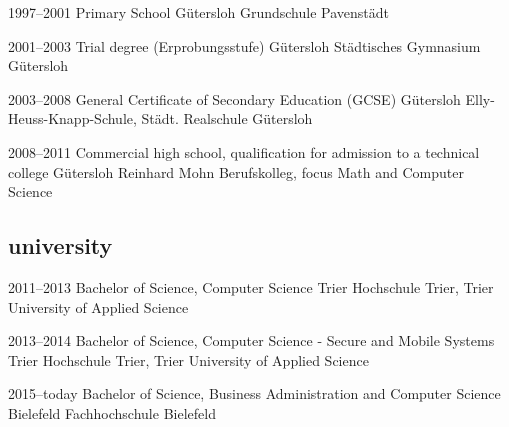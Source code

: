\documentclass[]{friggeri-cv} %
\begin{document}
\begin{entrylist}


\entry
{1997--2001}
{Primary School}
{G\"{u}tersloh}
{Grundschule Pavenst\"{a}dt}


\entry
{2001--2003}
{Trial degree (Erprobungsstufe)}
{G\"{u}tersloh}
{St\"{a}dtisches Gymnasium G\"{u}tersloh}


\entry
{2003--2008}
{General Certificate of Secondary Education (GCSE)}
{G\"{u}tersloh}
{Elly-Heuss-Knapp-Schule, St\"{a}dt. Realschule G\"{u}tersloh}


\entry
{2008--2011}
{Commercial high school, qualification for admission to a technical college}
{G\"{u}tersloh}
{Reinhard Mohn Berufskolleg, focus Math and Computer Science}


\end{entrylist}

\subsection{university}

\begin{entrylist}


\entry
{2011--2013}
{Bachelor of Science, Computer Science}
{Trier}
{Hochschule Trier, Trier University of Applied Science}


\entry
{2013--2014}
{Bachelor of Science, Computer Science - Secure and Mobile Systems}
{Trier}
{Hochschule Trier, Trier University of Applied Science}


\entry
{2015--today}
{Bachelor of Science, Business Administration and Computer Science}
{Bielefeld}
{Fachhochschule Bielefeld}

\\
\end{entrylist}
\end{document}
